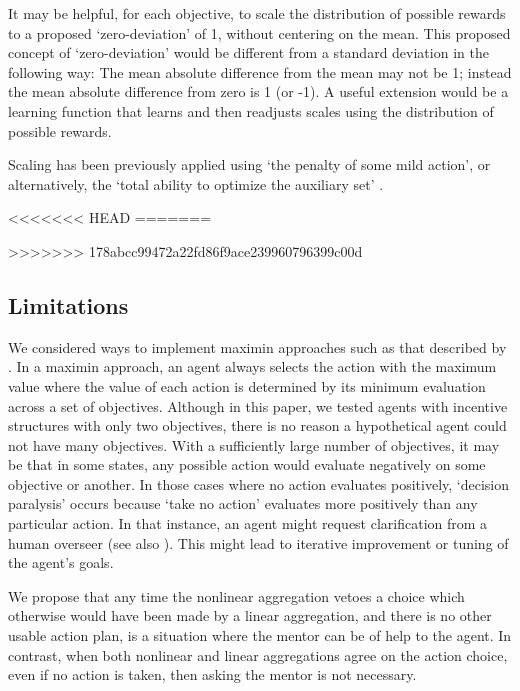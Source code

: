 It may be helpful, for each objective, to scale the distribution of possible rewards to a proposed `zero-deviation' of 1, without centering on the mean. This proposed concept of `zero-deviation' would be different from a standard deviation in the following way: The mean absolute difference from the mean may not be 1; instead the mean absolute difference from zero is 1 (or -1). A useful extension would be a learning function that learns and then readjusts scales using the distribution of possible rewards.

Scaling has been previously applied using `the penalty of some mild action', or alternatively, the `total ability to optimize the auxiliary set' %
\cite{turner_conservative_2020}.


<<<<<<< HEAD
=======


>>>>>>> 178abcc99472a22fd86f9ace239960796399c00d
\subsection{Limitations}

We considered ways to implement maximin approaches such as that described by \cite{vamplew_human-aligned_2018}. In a maximin approach, an agent always selects the action with the maximum value where the value of each action is determined by its minimum evaluation across a set of objectives. Although in this paper, we tested agents with incentive structures with only two objectives, there is no reason a hypothetical agent could not have many objectives. With a sufficiently large number of objectives, it may be that in some states, any possible action would evaluate negatively on some objective or another. In those cases where no action evaluates positively, `decision paralysis' occurs because `take no action' evaluates more positively than any particular action. %
 In that instance, an agent might request clarification from a human overseer (see also \cite{pmlr-v125-cohen20a}). This might lead to iterative improvement or tuning of the agent's goals.

We propose that any time the nonlinear aggregation vetoes a choice which otherwise would have been made by a linear aggregation, and there is no other usable action plan, is a situation where the mentor can be of help to the agent. %
In contrast, when both nonlinear and linear aggregations agree on the action choice, even if no action is taken, then asking the mentor is not necessary.

